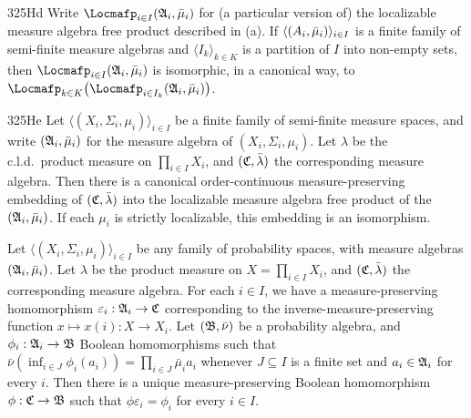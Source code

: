 \spheader 325Hd Write $\Locmafp_{i\in I}(\frak A_i,\bar\mu_i)$
for (a particular version of) the localizable measure algebra free
product described in (a).   If
$\langle\frak(A_i,\bar\mu_i)\rangle_{i\in I}$ is a
finite family of semi-finite measure algebras and
$\langle I_k\rangle_{k\in K}$ is a partition of $I$ into non-empty sets,
then $\Locmafp_{i\in I}(\frak A_i,\bar\mu_i)$ is isomorphic,
in a canonical way, to
$\Locmafp_{k\in K}\bigl(\Locmafp_{i\in I_k}(\frak A_i,\bar\mu_i)\bigr)$.

\spheader 325He Let $\langle(X_i,\Sigma_i,\mu_i)\rangle_{i\in I}$
be a finite family of semi-finite measure spaces, and write
$(\frak A_i,\bar\mu_i)$ for the measure algebra of $(X_i,\Sigma_i,\mu_i)$.
Let $\lambda$ be the c.l.d.\ product measure on
$\prod_{i\in I}X_i$, and
$(\frak C,\bar\lambda)$ the corresponding measure algebra.   Then there
is a canonical order-continuous measure-preserving embedding of
$(\frak C,\bar\lambda)$ into the localizable measure algebra free
product of the $(\frak A_i,\bar\mu_i)$.   If each $\mu_i$ is strictly
localizable, this embedding is an isomorphism.

  Let
$\langle(X_i,\Sigma_i,\mu_i)\rangle_{i\in I}$ be any family of probability spaces, with measure algebras
$(\frak A_i,\bar\mu_i)$.   Let $\lambda$ be the product measure on
$X=\prod_{i\in I}X_i$, and $(\frak C,\bar\lambda)$ the corresponding
measure algebra.   For each $i\in I$, we have a measure-preserving
homomorphism $\varepsilon_i:\frak A_i\to\frak C$ corresponding to the
inverse-measure-preserving function $x\mapsto x(i):X\to X_i$.   Let
$(\frak B,\bar\nu)$ be a probability algebra, and
$\phi_i:\frak A_i\to\frak B$ Boolean homomorphisms such that $\bar\nu(\inf_{i\in J}\phi_i(a_i))=\prod_{i\in J}\bar\mu_ia_i$ whenever $J\subseteq I$ is
a finite set and $a_i\in\frak A_i$ for every $i$.   Then there is a
unique measure-preserving Boolean homomorphism $\phi:\frak C\to\frak B$
such that $\phi\varepsilon_i=\phi_i$ for every $i\in I$.


